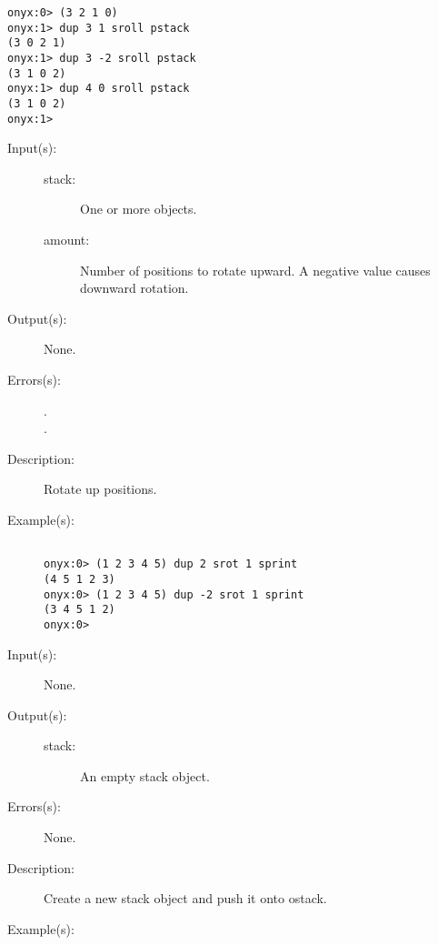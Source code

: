 \begin{description}
\begin{description}
\begin{verbatim}
onyx:0> (3 2 1 0)
onyx:1> dup 3 1 sroll pstack
(3 0 2 1)
onyx:1> dup 3 -2 sroll pstack
(3 1 0 2)
onyx:1> dup 4 0 sroll pstack
(3 1 0 2)
onyx:1>
		\end{verbatim}
	\end{description}
\label{systemdict:srot}
\item[{\onyxop{stack amount}{srot}{--}}: ]
	\begin{description}\item[]
	\item[Input(s): ]
		\begin{description}\item[]
		\item[stack: ]
			One or more objects.
		\item[amount: ]
			Number of positions to rotate  upward.  A
			negative value causes downward rotation.
		\end{description}
	\item[Output(s): ] None.
	\item[Errors(s): ]
		\begin{description}\item[]
		\item[.]
		\item[.]
		\end{description}
	\item[Description: ]
		Rotate  up  positions.
	\item[Example(s): ]\begin{verbatim}

onyx:0> (1 2 3 4 5) dup 2 srot 1 sprint
(4 5 1 2 3)
onyx:0> (1 2 3 4 5) dup -2 srot 1 sprint
(3 4 5 1 2)
onyx:0>
		\end{verbatim}
	\end{description}
\label{systemdict:stack}
\item[{\onyxop{--}{stack}{stack}}: ]
	\begin{description}\item[]
	\item[Input(s): ] None.
	\item[Output(s): ]
		\begin{description}\item[]
		\item[stack: ]
			An empty stack object.
		\end{description}
	\item[Errors(s): ] None.
	\item[Description: ]
		Create a new stack object and push it onto ostack.
	\item[Example(s): ]\begin{verbatim}


\end{verbatim}
\end{description}
\end{description}
